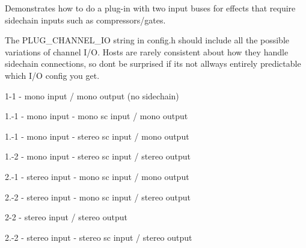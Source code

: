 Demonstrates how to do a plug-\/in with two input buses for effects that require sidechain inputs such as compressors/gates.

The {\ttfamily P\+L\+U\+G\+\_\+\+C\+H\+A\+N\+N\+E\+L\+\_\+\+IO} string in config.\+h should include all the possible variations of channel I/O. Hosts are rarely consistent about how they handle sidechain connections, so don\textquotesingle{}t be surprised if it\textquotesingle{}s not allways entirely predictable which I/O config you get.

1-\/1 -\/ mono input / mono output (no sidechain)

1.-\/1 -\/ mono input -\/ mono sc input / mono output

1.-\/1 -\/ mono input -\/ stereo sc input / mono output

1.-\/2 -\/ mono input -\/ stereo sc input / stereo output

2.-\/1 -\/ stereo input -\/ mono sc input / mono output

2.-\/2 -\/ stereo input -\/ mono sc input / stereo output

2-\/2 -\/ stereo input / stereo output

2.-\/2 -\/ stereo input -\/ stereo sc input / stereo output 